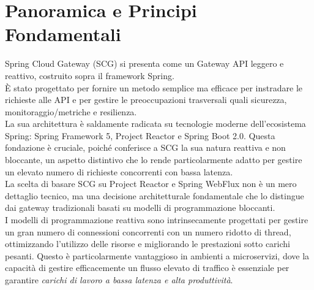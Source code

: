 \section{Panoramica e Principi Fondamentali}

Spring Cloud Gateway (SCG) si presenta come un Gateway API leggero e reattivo, costruito sopra il framework Spring. \\
È stato progettato per fornire un metodo semplice ma efficace per instradare le richieste alle API e per gestire le preoccupazioni trasversali quali sicurezza, monitoraggio/metriche e resilienza. \\
La sua architettura è saldamente radicata su tecnologie moderne dell'ecosistema Spring: Spring Framework 5, Project Reactor e Spring Boot 2.0. 
Questa fondazione è cruciale, poiché conferisce a SCG la sua natura reattiva e non bloccante, un aspetto distintivo che lo rende particolarmente adatto per gestire un elevato numero di richieste concorrenti con bassa latenza. \\

La scelta di basare SCG su Project Reactor e Spring WebFlux non è un mero dettaglio tecnico, ma una decisione architetturale fondamentale che lo distingue dai gateway tradizionali basati su modelli di programmazione bloccanti. \\
I modelli di programmazione reattiva sono intrinsecamente progettati per gestire un gran numero di connessioni concorrenti con un numero ridotto di thread, ottimizzando l'utilizzo delle risorse e migliorando le prestazioni sotto carichi pesanti. 
Questo è particolarmente vantaggioso in ambienti a microservizi, dove la capacità di gestire efficacemente un flusso elevato di traffico è essenziale per garantire \textit{carichi di lavoro a bassa latenza e alta produttività}.  \\

